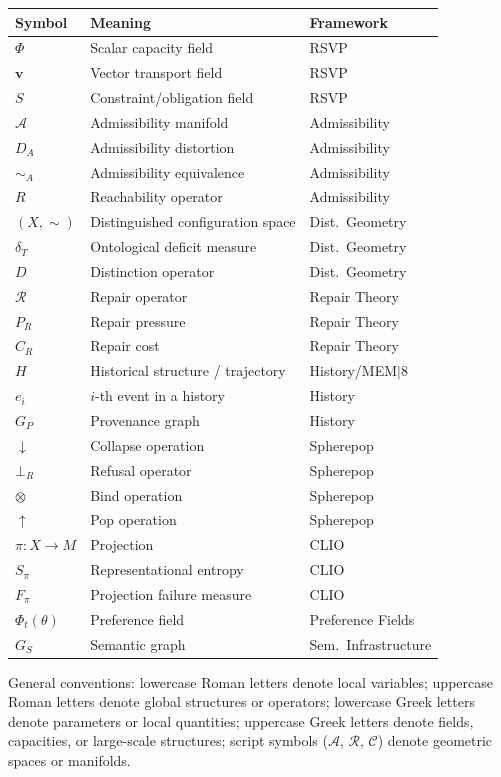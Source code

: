 \documentclass[11pt, oneside]{book}
\theoremstyle{definition}
\theoremstyle{remark}
\begin{document}
\begin{center}
\begin{tabular}{lll}
\toprule
Symbol & Meaning & Framework \\
\midrule
$\Phi$ & Scalar capacity field & RSVP \\
$\mathbf{v}$ & Vector transport field & RSVP \\
$S$ & Constraint/obligation field & RSVP \\
$\mathcal{A}$ & Admissibility manifold & Admissibility \\
$D_A$ & Admissibility distortion & Admissibility \\
$\sim_A$ & Admissibility equivalence & Admissibility \\
$R$ & Reachability operator & Admissibility \\
$(X, \sim)$ & Distinguished configuration space & Dist.\ Geometry \\
$\delta_T$ & Ontological deficit measure & Dist.\ Geometry \\
$D$ & Distinction operator & Dist.\ Geometry \\
$\mathcal{R}$ & Repair operator & Repair Theory \\
$P_R$ & Repair pressure & Repair Theory \\
$C_R$ & Repair cost & Repair Theory \\
$H$ & Historical structure / trajectory & History/MEM$|$8 \\
$e_i$ & $i$-th event in a history & History \\
$G_P$ & Provenance graph & History \\
$\downarrow$ & Collapse operation & Spherepop \\
$\bot_R$ & Refusal operator & Spherepop \\
$\otimes$ & Bind operation & Spherepop \\
$\uparrow$ & Pop operation & Spherepop \\
$\pi : X \to M$ & Projection & CLIO \\
$S_\pi$ & Representational entropy & CLIO \\
$F_\pi$ & Projection failure measure & CLIO \\
$\Phi_t(\theta)$ & Preference field & Preference Fields \\
$G_S$ & Semantic graph & Sem.\ Infrastructure \\
\bottomrule
\end{tabular}
\end{center}

General conventions: lowercase Roman letters denote local variables; uppercase Roman letters denote global structures or operators; lowercase Greek letters denote parameters or local quantities; uppercase Greek letters denote fields, capacities, or large-scale structures; script symbols ($\mathcal{A}$, $\mathcal{R}$, $\mathcal{C}$) denote geometric spaces or manifolds.
\end{document}
